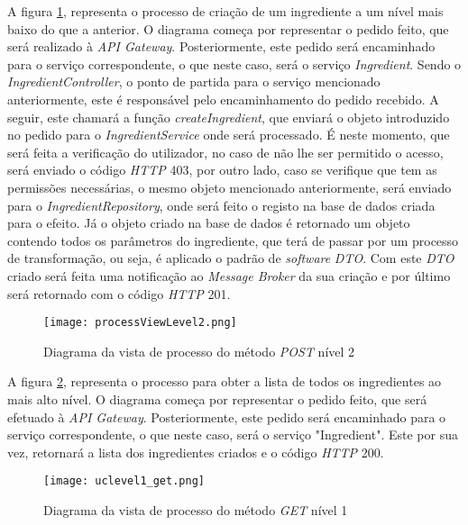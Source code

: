A figura \ref{fig:processView2}, representa o processo de criação de um ingrediente a um nível mais baixo do que a anterior. O diagrama começa por representar o pedido feito, que será realizado à \textit{API Gateway}. Posteriormente, este pedido será encaminhado para o serviço correspondente, o que neste caso, será o serviço \textit{Ingredient}. Sendo o \textit{IngredientController}, o ponto de partida para o serviço mencionado anteriormente, este é responsável pelo encaminhamento do pedido recebido. A seguir, este chamará a função \textit{createIngredient}, que enviará o objeto introduzido no pedido para o \textit{IngredientService} onde será processado. É neste momento, que será feita a verificação do utilizador, no caso de não lhe ser permitido o acesso, será enviado o código \textit{HTTP} 403, por outro lado, caso se verifique que tem as permissões necessárias, o mesmo objeto mencionado anteriormente, será enviado para o \textit{IngredientRepository}, onde será feito o registo na base de dados criada para o efeito. Já o objeto criado na base de dados é retornado um objeto contendo todos os parâmetros do ingrediente, que terá de passar por um processo de transformação, ou seja, é aplicado o padrão de \textit{software} \textit{DTO}. Com este \textit{DTO} criado será feita uma notificação ao \textit{Message Broker} da sua criação e por último será retornado com o código \textit{HTTP} 201.

\begin{figure}[H]
    \centering
    \texttt{[image: processViewLevel2.png]}
    \caption{Diagrama da vista de processo do método \textit{POST} nível 2}
    \label{fig:processView2}
\end{figure}



A figura \ref{fig:processGET1}, representa o processo para obter a lista de todos os ingredientes ao mais alto nível. O diagrama começa por representar o pedido feito, que será efetuado à \textit{API Gateway}. Posteriormente, este pedido será encaminhado para o serviço correspondente, o que neste caso, será o serviço "Ingredient". Este por sua vez, retornará a lista dos ingredientes criados e o código \textit{HTTP} 200.

\begin{figure}[H]
    \centering
    \texttt{[image: uclevel1\_get.png]}
    \caption{Diagrama da vista de processo do método \textit{GET} nível 1}
    \label{fig:processGET1}
\end{figure}

